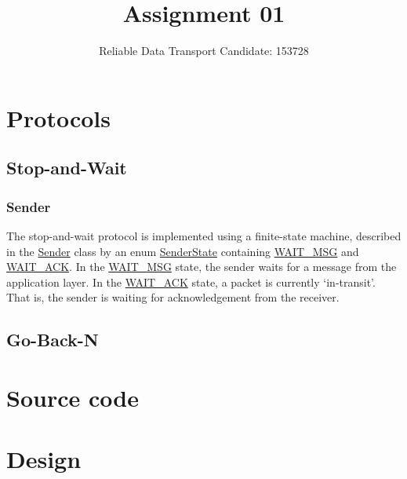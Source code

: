 \documentclass[a4paper]{article}
\title{\vspace{-5ex}Assignment 01}
\author{{Reliable Data Transport \hspace{1cm} Candidate: 153728}}
\date{}
\newcommand{\code}{\url}
\begin{document}
\maketitle
\vspace{-4ex}

\section{Protocols}

\subsection{Stop-and-Wait}

\subsubsection{Sender}

The stop-and-wait protocol is implemented using a finite-state machine, described in the \code{Sender} class by an enum \code{SenderState} containing \code{WAIT_MSG} and \code{WAIT_ACK}. In the \code{WAIT_MSG} state, the sender waits for a message from the application layer. In the \code{WAIT_ACK} state, a packet is currently `in-transit'. That is, the sender is waiting for acknowledgement from the receiver.


\subsection{Go-Back-N}

\section{Source code}

\section{Design}
\end{document}
